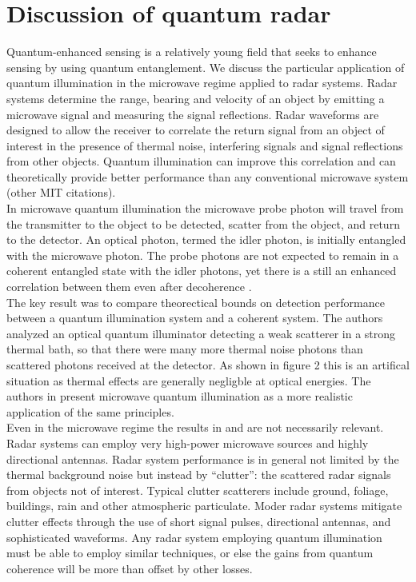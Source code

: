 \documentclass[a4paper,10pt,twocolumn]{article}
\numberwithin{equation}{section}
\begin{document}
\section{Discussion of quantum radar}
Quantum-enhanced sensing is a relatively young field that seeks to enhance sensing by using quantum entanglement. 
We discuss the particular application of quantum illumination in the microwave regime applied to radar systems.
Radar systems determine the range, bearing and velocity of an object by emitting a microwave signal and measuring the signal reflections.
Radar waveforms are designed to allow the receiver to correlate the return signal from an object of interest in the presence of thermal noise, interfering signals and signal reflections from other objects.
Quantum illumination can improve this correlation and can theoretically provide better performance than any conventional microwave system \cite{qi}(other MIT citations).
\\
In microwave quantum illumination the microwave probe photon will travel from the transmitter to the object to be detected, scatter from the object, and return to the detector.
An optical photon, termed the idler photon, is initially entangled with the microwave photon.
The probe photons are not expected to remain in a coherent entangled state with the idler photons, yet there is a still an enhanced correlation between them even after decoherence \cite{qig}. 
\\
The key result \cite{qig} was to compare theorectical bounds on detection performance between a quantum illumination system and a coherent system.
The authors analyzed an optical quantum illuminator detecting a weak scatterer in a strong thermal bath, so that there were many more thermal noise photons than scattered photons received at the detector. 
As shown in figure 2 this is an artifical situation as thermal effects are generally negligble at optical energies.
The authors in \cite{qi} present microwave quantum illumination as a more realistic application of the same principles.
\\
Even in the microwave regime the results in \cite{qig} and \cite{qi} are not necessarily relevant. 
Radar systems can employ very high-power microwave sources and highly directional antennas.
Radar system performance is in general not limited by the thermal background noise but instead by ``clutter'': the scattered radar signals from objects not of interest.
Typical clutter scatterers include ground, foliage, buildings, rain and other atmospheric particulate.
Moder radar systems mitigate clutter effects through the use of short signal pulses, directional antennas, and sophisticated waveforms.
Any radar system employing quantum illumination must be able to employ similar techniques, or else the gains from quantum coherence will be more than offset by other losses. 


\printbibliography
\end{document}
